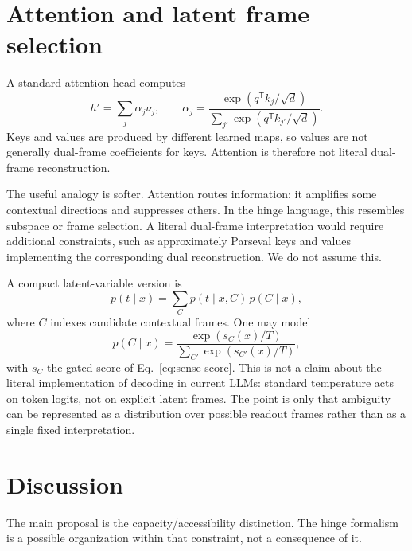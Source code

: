 \documentclass[
  aps,
  reprint,
  superscriptaddress,
  floatfix,
  nofootinbib,
  longbibliography
]{revtex4-2}
\newcommand{\T}{^{\mathsf{T}}}
\begin{document}
\section{Attention and latent frame selection}
\label{sec:attention}

A standard attention head computes
%
\begin{equation}
\label{eq:attention}
h'=\sum_j\alpha_j\nu_j,
\qquad
\alpha_j=
\frac{\exp(q\T k_j/\sqrt d)}
{\sum_{j'}\exp(q\T k_{j'}/\sqrt d)} .
\end{equation}
%
Keys and values are produced by different learned maps, so values are
not generally dual-frame coefficients for keys. Attention is therefore
not literal dual-frame reconstruction.

The useful analogy is softer. Attention routes information: it
amplifies some contextual directions and suppresses others. In the
hinge language, this resembles subspace or frame selection. A literal
dual-frame interpretation would require additional constraints, such
as approximately Parseval keys and values implementing the corresponding
dual reconstruction. We do not assume this.

A compact latent-variable version is
%
\begin{equation}
\label{eq:latent}
p(t\mid x)=\sum_C p(t\mid x,C)\,p(C\mid x),
\end{equation}
%
where $C$ indexes candidate contextual frames. One may model
%
\begin{equation}
\label{eq:frame-temp}
p(C\mid x)=
\frac{\exp(s_C(x)/T)}
{\sum_{C'}\exp(s_{C'}(x)/T)} ,
\end{equation}
%
with $s_C$ the gated score of Eq.~\eqref{eq:sense-score}. This is not
a claim about the literal implementation of decoding in current LLMs:
standard temperature acts on token logits, not on explicit latent
frames. The point is only that ambiguity can be represented as a
distribution over possible readout frames rather than as a single fixed
interpretation.

\section{Discussion}
\label{sec:discussion}

The main proposal is the capacity/accessibility distinction. The hinge
formalism is a possible organization within that constraint, not a
consequence of it.
\end{document}
